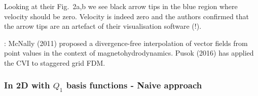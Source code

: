 Looking at their Fig.~2a,b we see black arrow tips in the blue region where 
velocity should be zero. Velocity is indeed zero and the authors confirmed that 
the arrow tips are an artefact of their visualisation software (!).

\Literature: 
McNally (2011) \cite{mcna11} proposed
a divergence-free interpolation of vector fields from point values in the context 
of magnetohydrodynamics.
Pusok \etal (2016) \cite{pukp16} has applied the CVI to staggered grid FDM.

 
\subsubsection{In 2D with $Q_1$ basis functions - Naive approach}

